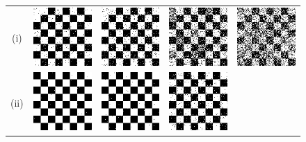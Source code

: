 \documentclass[10pt,journal,letterpaper,compsoc]{IEEEtran}
\begin{document}
\begin{figure}[t]
  \centering
  \setlength{\tabcolsep}{2pt}
  \begin{tabular}{ccccc}
    \small {(i)} & 
    \includegraphics[width=0.18\linewidth]{figures/synth_corrupt/synth_corrupt_1_1} &
    \includegraphics[width=0.18\linewidth]{figures/synth_corrupt/synth_corrupt_1_2} &
    \includegraphics[width=0.18\linewidth]{figures/synth_corrupt/synth_corrupt_1_3} &
    \includegraphics[width=0.18\linewidth]{figures/synth_corrupt/synth_corrupt_1_4} \\
    \small {(ii)} & 
    \includegraphics[width=0.18\linewidth]{figures/synth_corrupt/synth_corrupt_2_1} &
    \includegraphics[width=0.18\linewidth]{figures/synth_corrupt/synth_corrupt_2_2} &
    \includegraphics[width=0.18\linewidth]{figures/synth_corrupt/synth_corrupt_2_3} &

\end{tabular}
\end{figure}
\end{document}
